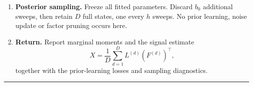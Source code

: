 \begin{enumerate}[leftmargin=*,label=\textbf{\arabic*.},itemsep=5pt]
\begin{enumerate}[label=(\alph*),leftmargin=*,itemsep=3pt]
  state, including the starting state. Record the loss before and after.
  Continue the chain from its last realized state for the next round.
  \end{enumerate}
\item \textbf{Posterior sampling.} Freeze all fitted parameters. Discard
\(b_0\) additional sweeps, then retain \(D\) full states, one every \(h\)
sweeps. No prior learning, noise update or factor pruning occurs here.
\item \textbf{Return.} Report marginal moments and the signal estimate
\[
\widehat X=\frac1D\sum_{d=1}^D L^{(d)}(F^{(d)})^\top,
\]
together with the prior-learning losses and sampling diagnostics.
\end{enumerate}
\smallskip\hrule\medskip

\clearpage
